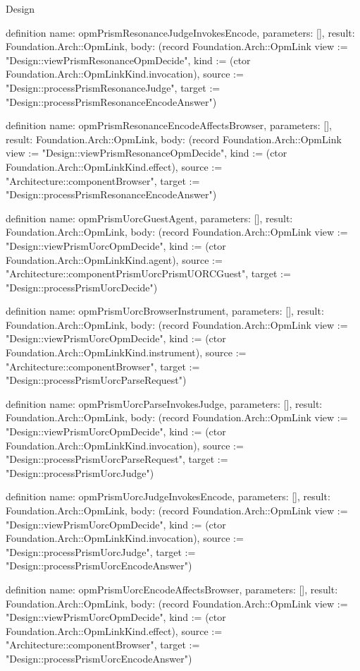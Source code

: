 \begin{lexlean}{Design}
\begin{semanticmodule}
definition{
  name: opmPrismResonanceJudgeInvokesEncode,
  parameters: [],
  result: Foundation.Arch::OpmLink,
  body: (record Foundation.Arch::OpmLink {view := "Design::viewPrismResonanceOpmDecide", kind := (ctor Foundation.Arch::OpmLinkKind.invocation), source := "Design::processPrismResonanceJudge", target := "Design::processPrismResonanceEncodeAnswer"})
}

definition{
  name: opmPrismResonanceEncodeAffectsBrowser,
  parameters: [],
  result: Foundation.Arch::OpmLink,
  body: (record Foundation.Arch::OpmLink {view := "Design::viewPrismResonanceOpmDecide", kind := (ctor Foundation.Arch::OpmLinkKind.effect), source := "Architecture::componentBrowser", target := "Design::processPrismResonanceEncodeAnswer"})
}

definition{
  name: opmPrismUorcGuestAgent,
  parameters: [],
  result: Foundation.Arch::OpmLink,
  body: (record Foundation.Arch::OpmLink {view := "Design::viewPrismUorcOpmDecide", kind := (ctor Foundation.Arch::OpmLinkKind.agent), source := "Architecture::componentPrismUorcPrismUORCGuest", target := "Design::processPrismUorcDecide"})
}

definition{
  name: opmPrismUorcBrowserInstrument,
  parameters: [],
  result: Foundation.Arch::OpmLink,
  body: (record Foundation.Arch::OpmLink {view := "Design::viewPrismUorcOpmDecide", kind := (ctor Foundation.Arch::OpmLinkKind.instrument), source := "Architecture::componentBrowser", target := "Design::processPrismUorcParseRequest"})
}

definition{
  name: opmPrismUorcParseInvokesJudge,
  parameters: [],
  result: Foundation.Arch::OpmLink,
  body: (record Foundation.Arch::OpmLink {view := "Design::viewPrismUorcOpmDecide", kind := (ctor Foundation.Arch::OpmLinkKind.invocation), source := "Design::processPrismUorcParseRequest", target := "Design::processPrismUorcJudge"})
}

definition{
  name: opmPrismUorcJudgeInvokesEncode,
  parameters: [],
  result: Foundation.Arch::OpmLink,
  body: (record Foundation.Arch::OpmLink {view := "Design::viewPrismUorcOpmDecide", kind := (ctor Foundation.Arch::OpmLinkKind.invocation), source := "Design::processPrismUorcJudge", target := "Design::processPrismUorcEncodeAnswer"})
}

definition{
  name: opmPrismUorcEncodeAffectsBrowser,
  parameters: [],
  result: Foundation.Arch::OpmLink,
  body: (record Foundation.Arch::OpmLink {view := "Design::viewPrismUorcOpmDecide", kind := (ctor Foundation.Arch::OpmLinkKind.effect), source := "Architecture::componentBrowser", target := "Design::processPrismUorcEncodeAnswer"})
}


\end{semanticmodule}
\end{lexlean}
